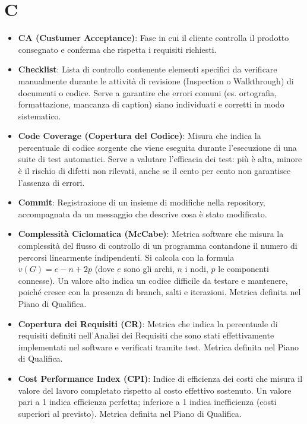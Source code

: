 \documentclass[11pt,a4paper]{article}
\begin{document}
\section*{C}
\begin{itemize}

\item \textbf{CA (Custumer Acceptance)}: Fase in cui il cliente controlla il prodotto consegnato e conferma che rispetta i requisiti richiesti.

\item \textbf{Checklist}: Lista di controllo contenente elementi specifici da verificare manualmente durante le attività di revisione (Inspection o Walkthrough) di documenti o codice. Serve a garantire che errori comuni (es. ortografia, formattazione, mancanza di caption) siano individuati e corretti in modo sistematico.

\item \textbf{Code Coverage (Copertura del Codice)}: Misura che indica la percentuale di codice sorgente che viene eseguita durante l'esecuzione di una suite di test automatici.
Serve a valutare l'efficacia dei test: più è alta, minore è il rischio di difetti non rilevati, anche se il cento per cento non garantisce l'assenza di errori.

\item \textbf{Commit}: Registrazione di un insieme di modifiche nella repository, accompagnata da un messaggio che descrive cosa è stato modificato.

\item \textbf{Complessità Ciclomatica (McCabe)}: Metrica software che misura la complessità del flusso di controllo di un programma contandone il numero di percorsi linearmente indipendenti. Si calcola con la formula $v(G)=e-n+2p$ (dove $e$ sono gli archi, $n$ i nodi, $p$ le componenti connesse). Un valore alto indica un codice difficile da testare e mantenere, poiché cresce con la presenza di branch, salti e iterazioni. Metrica definita nel Piano di Qualifica.

\item \textbf{Copertura dei Requisiti (CR)}: Metrica che indica la percentuale di requisiti definiti nell'Analisi dei Requisiti che sono stati effettivamente implementati nel software e verificati tramite test. Metrica definita nel Piano di Qualifica.

\item \textbf{Cost Performance Index (CPI)}: Indice di efficienza dei costi che misura il valore del lavoro completato rispetto al costo effettivo sostenuto. Un valore pari a 1 indica efficienza perfetta; inferiore a 1 indica inefficienza (costi superiori al previsto). Metrica definita nel Piano di Qualifica.


\end{itemize}
\end{document}
